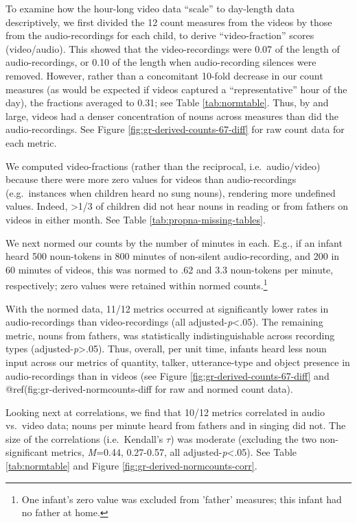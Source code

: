 \documentclass[man]{apa6}
\theoremstyle{definition}
\theoremstyle{definition}
\theoremstyle{definition}
\theoremstyle{remark}
\begin{document}
To examine how the hour-long video data \enquote{scale} to day-length
data descriptively, we first divided the 12 count measures from the
videos by those from the audio-recordings for each child, to derive
\enquote{video-fraction} scores (video/audio). This showed that the
video-recordings were 0.07 of the length of audio-recordings, or 0.10 of
the length when audio-recording silences were removed. However, rather
than a concomitant 10-fold decrease in our count measures (as would be
expected if videos captured a \enquote{representative} hour of the day),
the fractions averaged to 0.31; see Table \ref{tab:normtable}. Thus, by
and large, videos had a denser concentration of nouns across measures
than did the audio-recordings. See Figure
\ref{fig:gr-derived-counts-67-diff} for raw count data for each metric.

We computed video-fractions (rather than the reciprocal,
i.e.~audio/video) because there were more zero values for videos than
audio-recordings (e.g.~instances when children heard no sung nouns),
rendering more undefined values. Indeed, \textgreater{}1/3 of children
did not hear nouns in reading or from fathers on videos in either month.
See Table \ref{tab:propna-missing-tables}.

We next normed our counts by the number of minutes in each. E.g., if an
infant heard 500 noun-tokens in 800 minutes of non-silent
audio-recording, and 200 in 60 minutes of videos, this was normed to .62
and 3.3 noun-tokens per minute, respectively; zero values were retained
within normed
counts.\footnote{One infant's zero value was excluded from 'father' measures; this infant had no father at home.}

With the normed data, 11/12 metrics occurred at significantly lower
rates in audio-recordings than video-recordings (all
adjusted-\emph{p}\textless{}.05). The remaining metric, nouns from
fathers, was statistically indistinguishable across recording types
(adjusted-\emph{p}\textgreater{}.05). Thus, overall, per unit time,
infants heard less noun input across our metrics of quantity, talker,
utterance-type and object presence in audio-recordings than in videos
(see Figure \ref{fig:gr-derived-counts-67-diff} and
@ref(fig:gr-derived-normcounts-diff for raw and normed count data).

Looking next at correlations, we find that 10/12 metrics correlated in
audio vs.~video data; nouns per minute heard from fathers and in singing
did not. The size of the correlations (i.e.~Kendall's \(\tau\)) was
moderate (excluding the two non-significant metrics, \emph{M}=0.44,
0.27-0.57, all adjusted-\emph{p}\textless{}.05). See Table
\ref{tab:normtable} and Figure \ref{fig:gr-derived-normcounts-corr}.
\end{document}
